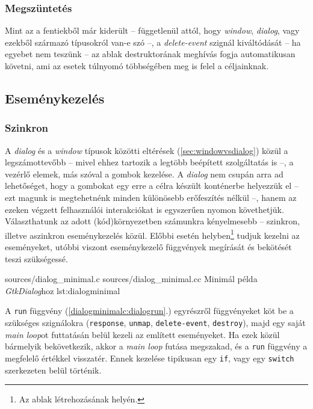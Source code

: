 \subsubsection{Megszüntetés}

Mint az a fentiekből már kiderült -- függetlenül attól, hogy \textit{window}, \textit{dialog}, vagy ezekből származó típusokról van-e szó --, a \textit{delete-event} szignál kiváltódását -- ha egyebet nem teszünk -- az ablak destruktorának meghívás fogja automatikusan követni, ami az esetek túlnyomó többségében meg is felel a céljainknak.

\subsection{Eseménykezelés}
\label{sec:dialogresponse}

\subsubsection{Szinkron}

A \textit{dialog} és a \textit{window} típusok közötti eltérések (\ref{sec:windowvsdialog}) közül a legszámottevőbb -- mivel ehhez tartozik a legtöbb beépített szolgáltatás is --, a vezérlő elemek, más szóval a gombok kezelése. A \textit{dialog} nem csupán arra ad lehetőséget, hogy a gombokat egy erre a célra készült konténerbe helyezzük el -- ezt magunk is megtehetnénk minden különösebb erőfeszítés nélkül --, hanem az ezeken végzett felhasználói interakciókat is egyszerűen nyomon követhetjük. Választhatunk az adott (kód)környezetben számunkra kényelmesebb -- szinkron, illetve aszinkron eseménykezelés közül. Előbbi esetén helyben\footnote{Az ablak létrehozásának helyén.} tudjuk kezelni az eseményeket, utóbbi viszont eseménykezelő függvények megírását és bekötését teszi szükségessé.

\lstinputsources
{sources/dialog_minimal.c}
{sources/dialog_minimal.cc}
{Minimál példa \textit{GtkDialog}hoz}
{lst:dialogminimal}

A \texttt{run} függvény (\ref{dialogminimalc:dialogrun}.) egyrészről függvényeket köt be a szükséges szignálokra (\texttt{response}, \texttt{unmap}, \texttt{delete-event}, \texttt{destroy}), majd egy saját \textit{main loop}ot futtatásán belül kezeli az említett eseményeket. Ha ezek közül bármelyik bekövetkezik, akkor a \textit{main loop} futása megszakad, és a \texttt{run} függvény a megfelelő értékkel visszatér. Ennek kezelése tipikusan egy \texttt{if}, vagy egy \texttt{switch} szerkezeten belül történik.

